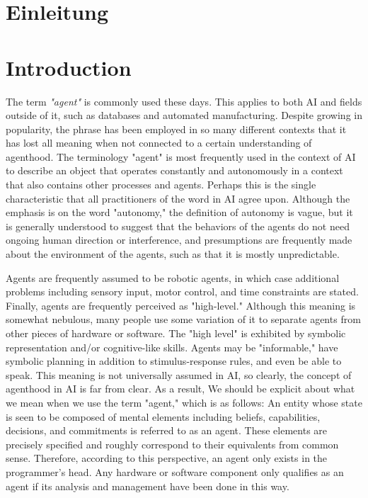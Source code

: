 {\chapter{Einleitung}}
{\chapter{Introduction}}

\label{sec:introduction}


The term \textit{"agent"} is commonly used these days. This applies to both \ac{AI} and fields outside of it, such as databases and automated manufacturing. Despite growing in popularity, the phrase has been employed in so many different contexts that it has lost all meaning when not connected to a certain understanding of agenthood. The terminology "agent" is most frequently used in the context of  \ac{AI} to describe an object that operates constantly and autonomously in a context that also contains other processes and agents.
Perhaps this is the single characteristic that all practitioners of the word in \ac{AI} agree upon. Although the emphasis is on the word "autonomy,"  the definition of autonomy is vague, but it is generally understood to suggest that the behaviors of the agents do not need ongoing human direction or interference, and presumptions are frequently made about the environment of the agents, such as that it is mostly unpredictable.

\vspace{.5cm}

Agents are frequently assumed to be robotic agents, in which case additional problems including sensory input, motor control, and time constraints are stated. Finally, agents are frequently perceived as "high-level." Although this meaning is somewhat nebulous, many people use some variation of it to separate agents from other pieces of hardware or software. The "high level" is exhibited by symbolic representation and/or cognitive-like skills. Agents may be "informable," have symbolic planning in addition to stimulus-response rules, and even be able to speak. This meaning is not universally assumed in \ac{AI}, so clearly, the concept of agenthood in \ac{AI} is far from clear. As a result, We should be explicit about what we mean when we use the term "agent," which is as follows: An entity whose state is seen to be composed of mental elements including beliefs, capabilities, decisions, and commitments is referred to as an agent. These elements are precisely specified and roughly correspond to their equivalents from common sense. Therefore, according to this perspective, an agent only exists in the programmer's head. Any hardware or software component only qualifies as an agent if its analysis and management have been done in this way.

